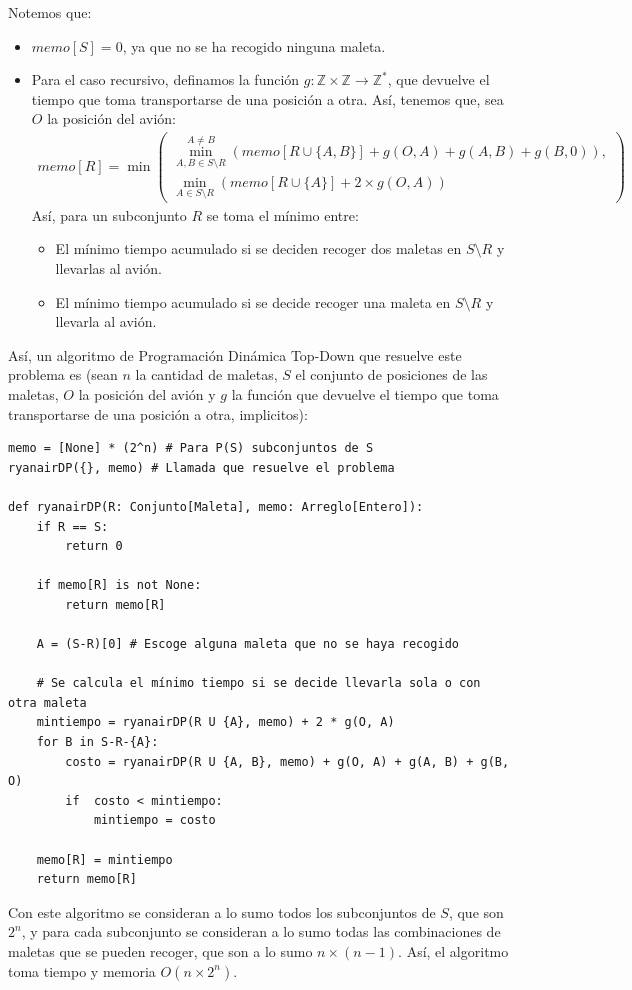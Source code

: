 \documentclass[letterpaper, 12pt]{article}
\begin{document}
\begin{enumerate}
Notemos que:
\begin{itemize}
    \item $memo[S] = 0$, ya que no se ha recogido ninguna maleta.
    \item Para el caso recursivo, definamos la función $g: \mathbb{Z} \times \mathbb{Z} \rightarrow \mathbb{Z}^*$, que devuelve el tiempo que toma transportarse de una posición a otra. Así, tenemos que, sea $O$ la posición del avión:
    \begin{align*}
        memo[R] = \min \left( \begin{array}{l}
            \min_{A, B \in S\setminus R}^{A \neq B} \left( memo[R \cup \{A, B\}] + g(O, A) + g(A, B) + g(B, 0) \right), \\
            \min_{A \in S \setminus R} \left( memo[R \cup \{A\}] + 2 \times g(O, A) \right)
        \end{array} \right)
    \end{align*}
    Así, para un subconjunto $R$ se toma el mínimo entre:
    \begin{itemize}
        \item El mínimo tiempo acumulado si se deciden recoger dos maletas en $S \setminus R$ y llevarlas al avión.
        \item El mínimo tiempo acumulado si se decide recoger una maleta en $S \setminus R$ y llevarla al avión.
    \end{itemize}
\end{itemize}

Así, un algoritmo de Programación Dinámica Top-Down que resuelve este problema es (sean $n$ la cantidad de maletas, $S$ el conjunto de posiciones de las maletas, $O$ la posición del avión y $g$ la función que devuelve el tiempo que toma transportarse de una posición a otra, implicitos):

\begin{verbatim}
memo = [None] * (2^n) # Para P(S) subconjuntos de S
ryanairDP({}, memo) # Llamada que resuelve el problema

def ryanairDP(R: Conjunto[Maleta], memo: Arreglo[Entero]):
    if R == S:
        return 0

    if memo[R] is not None:
        return memo[R]

    A = (S-R)[0] # Escoge alguna maleta que no se haya recogido

    # Se calcula el mínimo tiempo si se decide llevarla sola o con otra maleta
    mintiempo = ryanairDP(R U {A}, memo) + 2 * g(O, A)
    for B in S-R-{A}:
        costo = ryanairDP(R U {A, B}, memo) + g(O, A) + g(A, B) + g(B, O)
        if  costo < mintiempo:
            mintiempo = costo

    memo[R] = mintiempo
    return memo[R]
\end{verbatim}

Con este algoritmo se consideran a lo sumo todos los subconjuntos de $S$, que son $2^n$, y para cada subconjunto se consideran a lo sumo todas las combinaciones de maletas que se pueden recoger, que son a lo sumo $n \times (n - 1)$. Así, el algoritmo toma tiempo y memoria $O(n \times 2^n)$.

\end{enumerate} \vspace{4mm}
\end{document}
